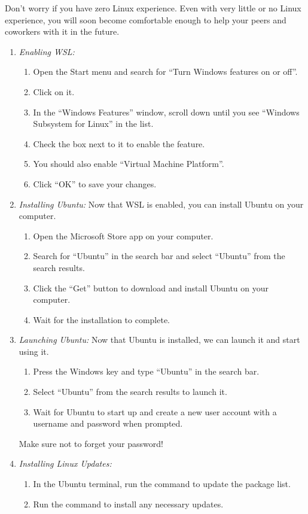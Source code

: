 \noindent Don't worry if you have zero Linux experience. 
Even with very little or no Linux experience, you will soon become comfortable enough to help your peers and coworkers with it in the future.
\begin{enumerate}
\item \emph{Enabling WSL:}
\begin{enumerate}
    \item Open the Start menu and search for ``Turn Windows features on or off''. 
    \item Click on it.
    \item In the ``Windows Features'' window, scroll down until you see ``Windows Subsystem for Linux'' in the list. 
    \item Check the box next to it to enable the feature.
    \item You should also enable ``Virtual Machine Platform''.
    \item Click ``OK'' to save your changes. 
\end{enumerate}

\item \emph{Installing Ubuntu:}
Now that WSL is enabled, you can install Ubuntu on your computer.
\begin{enumerate}
\item Open the Microsoft Store app on your computer.
\item Search for ``Ubuntu'' in the search bar and select ``Ubuntu'' from the search results.
\item Click the ``Get'' button to download and install Ubuntu on your computer.
\item Wait for the installation to complete.
\end{enumerate}

\item \emph{Launching Ubuntu:}
Now that Ubuntu is installed, we can launch it and start using it.
\begin{enumerate}
\item Press the Windows key and type ``Ubuntu'' in the search bar. 
\item Select ``Ubuntu'' from the search results to launch it.
\item Wait for Ubuntu to start up and create a new user account with a username and password when prompted.
\end{enumerate}
Make sure not to forget your password!

\item \emph{Installing Linux Updates:}
\begin{enumerate}
\item In the Ubuntu terminal, run the command  to update the package list.
\item Run the command  to install any necessary updates.
\end{enumerate}


\end{enumerate}
